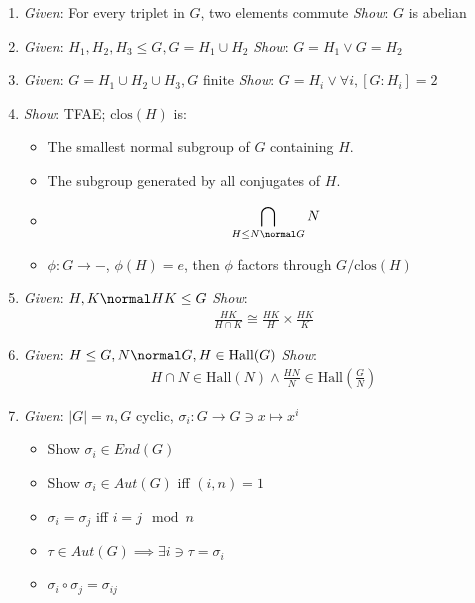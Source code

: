 \begin{enumerate}
\def\labelenumi{\arabic{enumi}.}
\item
  \emph{Given}: For every triplet in \(G\), two elements commute
  \emph{Show}: \(G\) is abelian
\item
  \emph{Given}: \(H_1, H_2, H_3 \leq G, G = H_1 \cup H_2\) \emph{Show}:
  \(G=H_1 \vee G=H_2\)
\item
  \emph{Given}: \(G=H_1 \cup H_2 \cup H_3, G\) finite \emph{Show}:
  \(G=H_i \vee \forall i, [G:H_i] = 2\)
\item
  \emph{Show}: TFAE; \(\text{clos}(H)\) is:

  \begin{itemize}
  \tightlist
  \item
    The smallest normal subgroup of \(G\) containing \(H\).
  \item
    The subgroup generated by all conjugates of \(H\).
  \item

    \begin{align*}\bigcap_{H \leq N \normal G} N\end{align*}
  \item
    \(\phi: G \rightarrow -\), \(\phi(H) = e\), then \(\phi\) factors
    through \(G/\text{clos}(H)\)
  \end{itemize}
\item
  \emph{Given}: \(H, K \normal HK \leq G\) \emph{Show}:
  \begin{align*} \frac{HK}{H\cap K} \cong \frac{HK}{H}\times \frac{HK}{K}\end{align*}
\item
  \emph{Given}: \(H\leq G, N \normal G, H \in \text{Hall}(G)\)
  \emph{Show}:
  \begin{align*}H\cap N \in \text{Hall}(N) \wedge \frac{HN}{N} \in \text{Hall}(\frac{G}{N})\end{align*}
\item
  \emph{Given}: \(|G| = n, G\) cyclic,
  \(\sigma_i: G \rightarrow G \ni x \mapsto x^i\)

  \begin{itemize}
  \tightlist
  \item
    Show \(\sigma_i \in End(G)\)
  \item
    Show \(\sigma_i \in Aut(G)\) iff \((i, n) = 1\)
  \item
    \(\sigma_i = \sigma_j\) iff \(i=j\mod n\)
  \item
    \(\tau \in Aut(G) \implies \exists i \ni \tau = \sigma_i\)
  \item
    \(\sigma_i \circ \sigma_j = \sigma_{ij}\)
  \end{itemize}


\end{enumerate}
